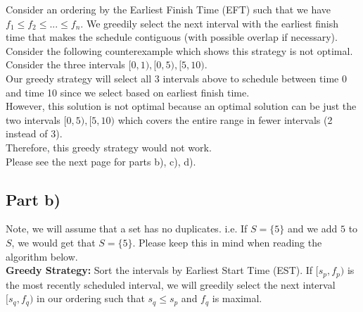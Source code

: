 \documentclass[12pt]{article}
\begin{document}
Consider an ordering by the Earliest Finish Time (EFT) such that we have $f_1 \leq f_2 \leq ... \leq f_n$. We greedily select the next interval with the earliest finish time that makes the schedule contiguous (with possible overlap if necessary). \\

Consider the following counterexample which shows this strategy is not optimal. \\

Consider the three intervals $[0,1), [0,5), [5,10)$. \\

Our greedy strategy will select all 3 intervals above to schedule between time 0 and time 10 since we select based on earliest finish time. \\

However, this solution is not optimal because an optimal solution can be just the two intervals $[0,5), [5,10)$ which covers the entire range in fewer intervals (2 instead of 3). \\

Therefore, this greedy strategy would not work. \\

Please see the next page for parts b), c), d).  

\newpage

\subsection*{Part b)}

Note, we will assume that a set has no duplicates. i.e. If $S = \{5\}$ and we add $5$ to $S$, we would get that $S = \{5\}$. Please keep this in mind when reading the algorithm below. \\

\textbf{Greedy Strategy:} Sort the intervals by Earliest Start Time (EST). If $[s_p, f_p)$ is the most recently scheduled interval, we will greedily select the next interval $[s_q, f_q)$ in our ordering such that $s_q \leq s_p$ and $f_q$ is maximal. \\
\end{document}
